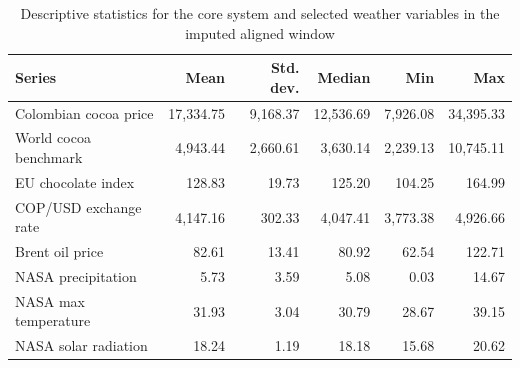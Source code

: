\documentclass[11pt]{article}
\begin{document}
\begin{table}[H]
\centering
\caption{Descriptive statistics for the core system and selected weather variables in the imputed aligned window}
\label{tab:descriptive_stats}
\small
\begin{tabular}{p{4.0cm}rrrrr}
\toprule
Series & Mean & Std. dev. & Median & Min & Max \\
\midrule
Colombian cocoa price & 17{,}334.75 & 9{,}168.37 & 12{,}536.69 & 7{,}926.08 & 34{,}395.33 \\
World cocoa benchmark & 4{,}943.44 & 2{,}660.61 & 3{,}630.14 & 2{,}239.13 & 10{,}745.11 \\
EU chocolate index & 128.83 & 19.73 & 125.20 & 104.25 & 164.99 \\
COP/USD exchange rate & 4{,}147.16 & 302.33 & 4{,}047.41 & 3{,}773.38 & 4{,}926.66 \\
Brent oil price & 82.61 & 13.41 & 80.92 & 62.54 & 122.71 \\
NASA precipitation & 5.73 & 3.59 & 5.08 & 0.03 & 14.67 \\
NASA max temperature & 31.93 & 3.04 & 30.79 & 28.67 & 39.15 \\
NASA solar radiation & 18.24 & 1.19 & 18.18 & 15.68 & 20.62 \\
\bottomrule
\end{tabular}
\normalsize
\end{table}

\begin{table}[H]
\centering
\caption{Selected preliminary statistical properties from the imputed aligned panel}
\label{tab:stats_overview}
\end{table}
\end{document}
